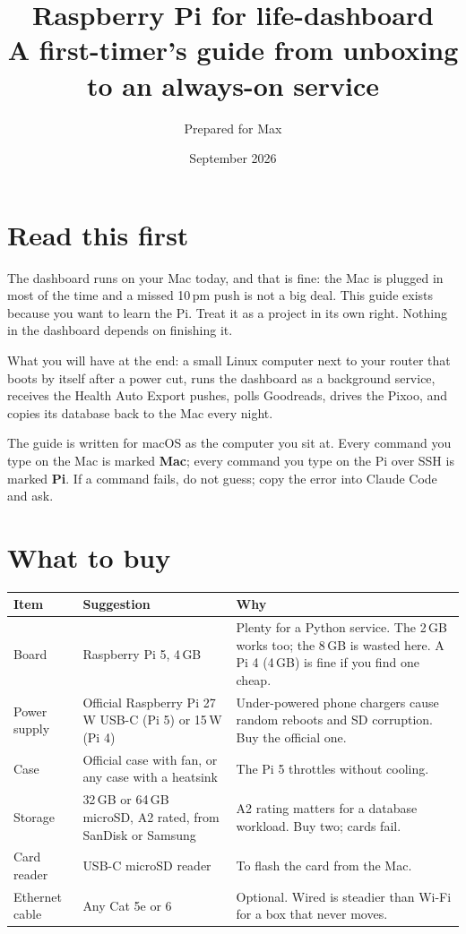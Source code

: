 \documentclass[11pt,letterpaper]{article}
\title{Raspberry Pi for life-dashboard\\
  \large A first-timer's guide from unboxing to an always-on service}
\author{Prepared for Max}
\date{September 2026}
\begin{document}
\maketitle

\section*{Read this first}

The dashboard runs on your Mac today, and that is fine: the Mac is plugged in most of the time and a missed 10\,pm push is not a big deal. This guide exists because you want to learn the Pi. Treat it as a project in its own right. Nothing in the dashboard depends on finishing it.

What you will have at the end: a small Linux computer next to your router that boots by itself after a power cut, runs the dashboard as a background service, receives the Health Auto Export pushes, polls Goodreads, drives the Pixoo, and copies its database back to the Mac every night.

The guide is written for macOS as the computer you sit at. Every command you type on the Mac is marked \textbf{Mac}; every command you type on the Pi over SSH is marked \textbf{Pi}. If a command fails, do not guess; copy the error into Claude Code and ask.

\tableofcontents
\newpage

\section{What to buy}

\begin{tabular}{@{}p{2.2cm}p{5.4cm}p{7.9cm}@{}}
\toprule
Item & Suggestion & Why \\
\midrule
Board & Raspberry Pi 5, 4\,GB & Plenty for a Python service. The 2\,GB works too; the 8\,GB is wasted here. A Pi 4 (4\,GB) is fine if you find one cheap. \\
Power supply & Official Raspberry Pi 27\,W USB-C (Pi 5) or 15\,W (Pi 4) & Under-powered phone chargers cause random reboots and SD corruption. Buy the official one. \\
Case & Official case with fan, or any case with a heatsink & The Pi 5 throttles without cooling. \\
Storage & 32\,GB or 64\,GB microSD, A2 rated, from SanDisk or Samsung & A2 rating matters for a database workload. Buy two; cards fail. \\
Card reader & USB-C microSD reader & To flash the card from the Mac. \\
Ethernet cable & Any Cat 5e or 6 & Optional. Wired is steadier than Wi-Fi for a box that never moves. \\
\bottomrule
\end{tabular}
\end{document}

